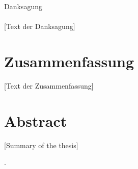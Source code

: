 \documentclass[oneside,bibliography=totocnumbered,BCOR=5mm]{scrbook}
\begin{document}
\thispagestyle{empty}
\vspace*{2.2cm}
\noindent
{\Huge Danksagung}\\
\vspace*{1.6cm} \\

[Text der Danksagung]

\newpage
\thispagestyle{empty}
\section*{Zusammenfassung}
[Text der Zusammenfassung]

\section*{Abstract}
[Summary of the thesis]


\clearpage

\tableofcontents
.
\newpage





\end{document}
